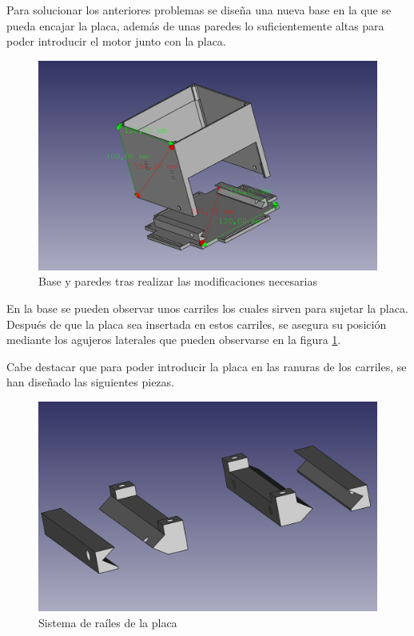 Para solucionar los anteriores problemas se diseña una nueva base en la que se pueda encajar la placa, además de unas paredes lo suficientemente altas para poder introducir el motor junto con la placa.

 \begin{figure}[H]
    \centering
    \includegraphics[width=.9\linewidth]{pictures/paredesybasenuevas.png}
    \caption{Base y paredes tras realizar las modificaciones necesarias}
    \label{fig:placa_y_paredes_nuevas}
\end{figure}

En la base se pueden observar unos carriles los cuales sirven para sujetar la placa.
Después de que la placa sea insertada en estos carriles, se asegura su posición mediante los agujeros laterales que pueden observarse en la figura \ref{fig:placa_y_paredes_nuevas}.

Cabe destacar que para poder introducir la placa en las ranuras de los carriles, se han diseñado las siguientes piezas.

 \begin{figure}[H]
    \centering
    \includegraphics[width=.9\linewidth]{pictures/railes.png}
    \caption{Sistema de raíles de la placa}
    \label{fig:railes_placa}
\end{figure}


